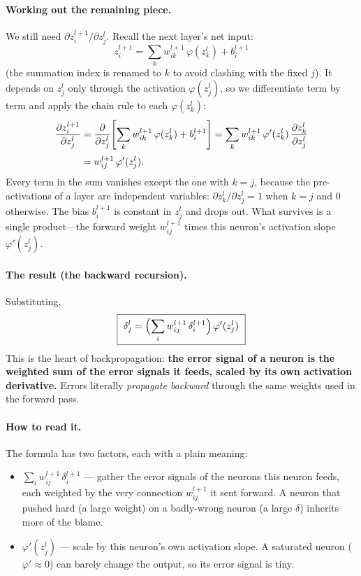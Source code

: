 \documentclass[11pt,a4paper]{report}
\theoremstyle{definition}
\theoremstyle{remark}
\newcommand{\pd}[2]{\frac{\partial #1}{\partial #2}}
\begin{document}
\paragraph{Working out the remaining piece.} We still need
$\partial z^{l+1}_{i}/\partial z^{l}_{j}$. Recall the next layer's net input:
\[
z^{l+1}_{i}=\sum_{k}w^{l+1}_{ik}\,\varphi(z^{l}_{k})+b^{l+1}_{i}
\]
(the summation index is renamed to $k$ to avoid clashing with the fixed $j$). It
depends on $z^{l}_{j}$ only through the activation $\varphi(z^{l}_{j})$, so we
differentiate term by term and apply the chain rule to each $\varphi(z^{l}_{k})$:
\begin{align}
\pd{z^{l+1}_{i}}{z^{l}_{j}}
&=\pd{}{z^{l}_{j}}\!\left[\sum_{k}w^{l+1}_{ik}\,\varphi(z^{l}_{k})+b^{l+1}_{i}\right]
 =\sum_{k}w^{l+1}_{ik}\,\varphi'(z^{l}_{k})\,\pd{z^{l}_{k}}{z^{l}_{j}}
 \notag\\[2pt]
&=w^{l+1}_{ij}\,\varphi'(z^{l}_{j}).
\label{eq:dzdz}
\end{align}
Every term in the sum vanishes except the one with $k=j$, because the
pre-activations of a layer are independent variables: $\partial z^{l}_{k}/\partial
z^{l}_{j}=1$ when $k=j$ and $0$ otherwise. The bias $b^{l+1}_{i}$ is constant in
$z^{l}_{j}$ and drops out. What survives is a single product---the forward weight
$w^{l+1}_{ij}$ times this neuron's activation slope $\varphi'(z^{l}_{j})$.
\paragraph{The result (the backward recursion).} Substituting,
\begin{equation}
\boxed{\ \delta^{l}_{j}=\Bigl(\sum_{i}w^{l+1}_{ij}\,\delta^{l+1}_{i}\Bigr)\,\varphi'(z^{l}_{j})\ }
\label{eq:hid2}
\end{equation}
This is the heart of backpropagation: \textbf{the error signal of a neuron is the
weighted sum of the error signals it feeds, scaled by its own activation
derivative.} Errors literally \emph{propagate backward} through the same weights
used in the forward pass.

\paragraph{How to read it.} The formula has two factors, each with a plain
meaning:
\begin{itemize}[nosep]
  \item $\displaystyle\sum_{i}w^{l+1}_{ij}\,\delta^{l+1}_{i}$ --- gather the error
        signals of the neurons this neuron feeds, each weighted by the very
        connection $w^{l+1}_{ij}$ it sent forward. A neuron that pushed hard (a
        large weight) on a badly-wrong neuron (a large $\delta$) inherits more of
        the blame.
  \item $\varphi'(z^{l}_{j})$ --- scale by this neuron's own activation slope. A
        saturated neuron ($\varphi'\approx0$) can barely change the output, so
        its error signal is tiny.
\end{itemize}
\end{document}
